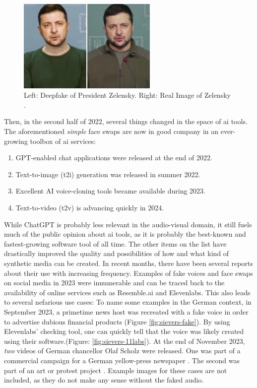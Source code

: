 \documentclass[
  a4paper,  %
  twoside,  %
  bibliography=totoc,
  headsepline,
  cleardoublepage=empty,
  parskip=half,
  draft=false
]{scrbook}
\begin{document}
\begin{figure}[h]
  \centering
  \includegraphics[width=0.6\textwidth]{./graphics/Zelensky.jpg}
  \caption{Left: Deepfake of President Zelensky. Right: Real Image of Zelensky \cite{universityofvirginiaZelenskyySurrenderHoax2022}.}
  \label{fig:zelensky-Deepfake}
\end{figure}

Then, in the second half of 2022, several things changed in the space of \gls{ai} tools. The aforementioned \textit{simple} face swaps are now in good company in an ever-growing toolbox of \gls{ai} services: 
\begin{enumerate}
  \item GPT-enabled chat applications were released at the end of 2022.
  \item Text-to-image (t2i) generation was released in summer 2022.
  \item Excellent AI voice-cloning tools became available during 2023.
  \item Text-to-video (t2v) is advancing quickly in 2024.
\end{enumerate}
While ChatGPT is probably less relevant in the audio-visual domain, it still fuels much of the public opinion about \gls{ai} tools, as it is probably the best-known and fastest-growing software tool of all time. The other items on the list have drastically improved the quality and possibilities of how and what kind of synthetic media can be created. In recent months, there have been several reports about their use with increasing frequency. Examples of fake voices and face swaps on social media in 2023 were innumerable and can be traced back to the availability of online services such as Resemble.ai and Elevenlabs. This also leads to several nefarious use cases: To name some examples in the German context, in September 2023, a primetime news host was recreated with a fake voice in order to advertise dubious financial products (Figure \ref{fig:sievers-fake}). By using Elevenlabs' checking tool, one can quickly tell that the voice was likely created using their software.(Figure: \ref{fig:sievers-11labs}). At the end of November 2023, \textit{two} videos of German chancellor Olaf Scholz were released. One was part of a commercial campaign for a German yellow-press newspaper \cite{niemeierSpringerTrommeltMit2023}. The second was part of an art or protest project \cite{zdfKunstinstallationDeepfakeScholzVerkuendet2023}. Example images for these cases are not included, as they do not make any sense without the faked audio. 
\end{document}
